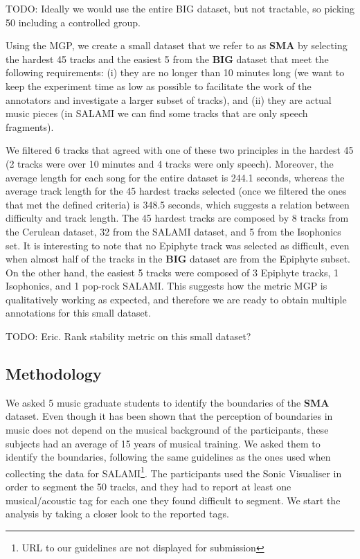 \documentclass{article}
\begin{document}
TODO: Ideally we would use the entire BIG dataset, but not tractable, so picking 50 including a controlled group.

Using the MGP, we create a small dataset that we refer to as \textbf{SMA} by selecting the hardest 45 tracks and the easiest 5 from the \textbf{BIG} dataset that meet the following requirements: (i) they are no longer than 10 minutes long (we want to keep the experiment time as low as possible to facilitate the work of the annotators and investigate a larger subset of tracks), and (ii) they are actual music pieces (in SALAMI we can find some tracks that are only speech fragments).

We filtered 6 tracks that agreed with one of these two principles in the hardest 45 (2 tracks were over 10 minutes and 4 tracks were only speech). 
Moreover, the average length for each song for the entire dataset is 244.1 seconds, whereas the average track length for the 45 hardest tracks selected (once we filtered the ones that met the defined criteria) is 348.5 seconds, which suggests a relation between difficulty and track length.
The 45 hardest tracks are composed by 8 tracks from the Cerulean dataset, 32 from the SALAMI dataset, and 5 from the Isophonics set.
It is interesting to note that no Epiphyte track was selected as difficult, even when almost half of the tracks in the \textbf{BIG} dataset are from the Epiphyte subset.
On the other hand, the easiest 5 tracks were composed of 3 Epiphyte tracks, 1 Isophonics, and 1 pop-rock SALAMI.
This suggests how the metric MGP is qualitatively working as expected, and therefore we are ready to obtain multiple annotations for this small dataset.

TODO: Eric. Rank stability metric on this small dataset?

\subsection{Methodology}

We asked 5 music graduate students to identify the boundaries of the \textbf{SMA} dataset.
Even though it has been shown that the perception of boundaries in music does not depend on the musical background of the participants\cite{Bruderer2009}, these subjects had an average of 15 years of musical training.
We asked them to identify the boundaries, following the same guidelines as the ones used when collecting the data for SALAMI\cite{Smith2011}\footnote{URL to our guidelines are not displayed for submission}.
The participants used the Sonic Visualiser\cite{Cannam2006} in order to segment the 50 tracks, and they had to report at least one musical/acoustic tag for each one they found difficult to segment.
We start the analysis by taking a closer look to the reported tags.
\end{document}
